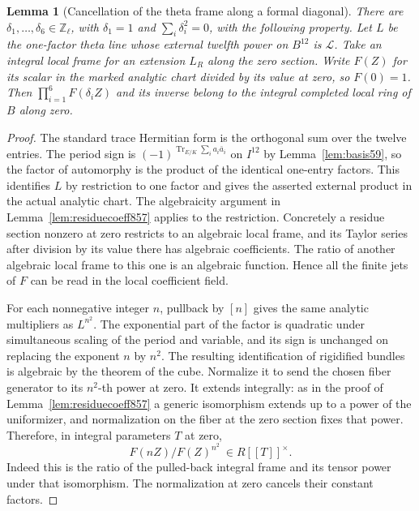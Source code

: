 \documentclass[a4paper,11pt]{article}
\newtheorem{lemma}[proposition]{Lemma}
\theoremstyle{definition}
\theoremstyle{remark}
\numberwithin{equation}{section}
\begin{document}
\begin{lemma}[Cancellation of the theta frame along a formal diagonal]
\leavevmode\label{lem:diagonalframe858}
There are \(\delta_1,\ldots,\delta_6\in\mathbb Z_\ell\), with
\(\delta_1=1\) and \(\sum_i\delta_i^2=0\), with the following
property. Let \(L\) be the one-factor theta line whose external
twelfth power on \(B^{12}\) is \(\mathcal L\).
Take an integral local frame for an extension \(L_R\) along the
zero section. Write \(F(Z)\) for its scalar in the marked
analytic chart divided by its value at zero, so \(F(0)=1\).
Then \(\prod_{i=1}^6 F(\delta_i Z)\) and its inverse belong
to the integral completed local ring of \(B\) along zero.
\end{lemma}
\begin{proof}
The standard trace Hermitian form is the orthogonal sum over
the twelve entries. The period sign is
\((-1)^{\operatorname{Tr}_{E/K}\sum_i a_i\bar a_i}\) on
\(I^{12}\) by Lemma~\ref{lem:basis59}, so the factor of
automorphy is the product of the identical one-entry factors.
This identifies \(L\) by restriction to one factor and gives
the asserted external product in the actual analytic chart.
The algebraicity argument in Lemma~\ref{lem:residuecoeff857}
applies to the restriction. Concretely a residue section nonzero
at zero restricts to an algebraic local frame, and its Taylor
series after division by its value there has algebraic
coefficients. The ratio of another algebraic local frame to
this one is an algebraic function. Hence all the finite jets
of \(F\) can be read in the local coefficient field.

For each nonnegative integer \(n\), pullback by \([n]\) gives
the same analytic multipliers as \(L^{n^2}\). The exponential
part of the factor is quadratic under simultaneous scaling of
the period and variable, and its sign is unchanged on replacing
the exponent \(n\) by \(n^2\). The resulting identification
of rigidified bundles is algebraic by the theorem of the cube.
Normalize it to send the chosen fiber generator to its
\(n^2\)-th power at zero. It extends integrally: as in the
proof of Lemma~\ref{lem:residuecoeff857} a generic isomorphism
extends up to a power of the uniformizer, and normalization
on the fiber at the zero section fixes that power. Therefore,
in integral parameters \(T\) at zero,
\[
                   F(nZ)/F(Z)^{n^2}\ \in R[[T]]^\times .
\]
Indeed this is the ratio of the pulled-back integral frame
and its tensor power under that isomorphism. The normalization
at zero cancels their constant factors.


\end{proof}
\end{document}
